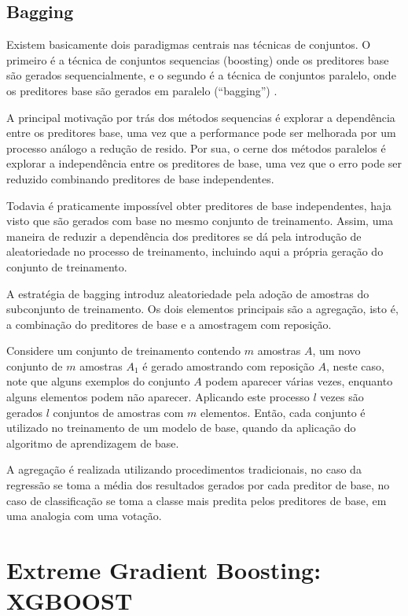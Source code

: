 \subsection{Bagging}

Existem basicamente dois paradigmas centrais nas técnicas de conjuntos. O primeiro é a técnica de conjuntos sequencias (boosting) onde os preditores base são gerados sequencialmente, e o segundo é a técnica de conjuntos paralelo, onde os preditores base são gerados em paralelo (``bagging'') \cite{BREIMAN:1996}.

A principal motivação por trás dos métodos sequencias é explorar a dependência entre os preditores base, uma vez que a performance pode ser melhorada por um processo análogo a redução de resido. Por sua, o cerne dos métodos paralelos é explorar a independência entre os preditores de base, uma vez que o erro pode ser reduzido combinando preditores de base independentes.

Todavia é praticamente impossível obter preditores de base independentes, haja visto que são gerados com base no mesmo conjunto de treinamento. Assim, uma maneira de reduzir a dependência dos preditores se dá pela introdução de aleatoriedade no processo de treinamento, incluindo aqui a própria geração do conjunto de treinamento.

A estratégia de bagging introduz aleatoriedade pela adoção de amostras do subconjunto de treinamento. Os dois elementos principais são a agregação, isto é, a combinação do preditores de base e a amostragem com reposição.

Considere um conjunto de treinamento contendo $m$ amostras $A$, um novo conjunto de $m$ amostras $A_1$ é gerado amostrando com reposição $A$, neste caso, note que alguns exemplos do conjunto $A$ podem aparecer várias vezes, enquanto alguns elementos podem não aparecer. Aplicando este processo $l$ vezes são gerados $l$ conjuntos de amostras com $m$ elementos. Então, cada conjunto é utilizado no treinamento de um modelo de base, quando da aplicação do algoritmo de aprendizagem de base.

A agregação é realizada utilizando procedimentos tradicionais, no caso da regressão se toma a média dos resultados gerados por cada preditor de base, no caso de classificação se toma a classe mais predita pelos preditores de base, em uma analogia com uma votação.

\section{Extreme Gradient Boosting: XGBOOST}

